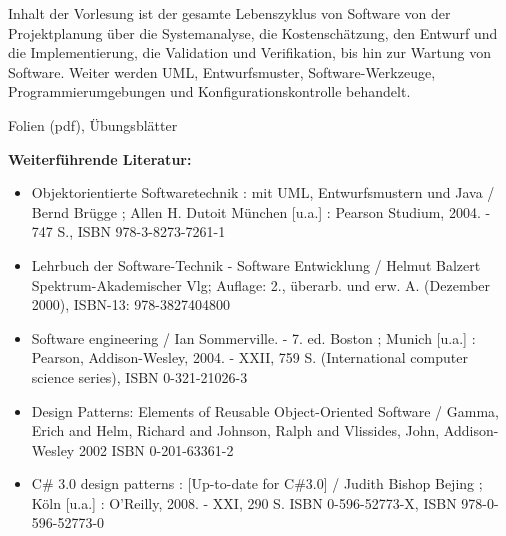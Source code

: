 \begin{course}
\begin{content}
Inhalt der Vorlesung ist der gesamte Lebenszyklus von Software von der Projektplanung über die Systemanalyse, die Kostenschätzung, den Entwurf und die Implementierung, die Validation und Verifikation, bis hin zur Wartung von Software. Weiter werden UML, Entwurfsmuster, Software-Werkzeuge, Programmierumgebungen und Konfigurationskontrolle behandelt.


\end{content}

\begin{media}Folien (pdf), Übungsblätter

\end{media}

\begin{literature}\textbf{Weiterführende Literatur:}

 \begin{itemize}\item Objektorientierte Softwaretechnik : mit UML, Entwurfsmustern und Java / Bernd Brügge ; Allen H. Dutoit\newline
 München [u.a.] : Pearson Studium, 2004. - 747 S., ISBN 978-3-8273-7261-1  \item Lehrbuch der Software-Technik - Software Entwicklung / Helmut Balzert\newline
Spektrum-Akademischer Vlg; Auflage: 2., überarb. und erw. A. (Dezember 2000), ISBN-13: 978-3827404800  \item Software engineering / Ian Sommerville. - 7. ed.\newline
Boston ; Munich [u.a.] : Pearson, Addison-Wesley, 2004. - XXII, 759 S. \newline
(International computer science series), ISBN 0-321-21026-3  \item Design Patterns: Elements of Reusable Object-Oriented Software / Gamma, Erich and Helm, Richard and Johnson, Ralph and Vlissides, John, Addison-Wesley 2002\newline
ISBN 0-201-63361-2  \item C\# 3.0 design patterns : [Up-to-date for C\#3.0] / Judith Bishop\newline
Bejing ; Köln [u.a.] : O'Reilly, 2008. - XXI, 290 S. \newline
ISBN 0-596-52773-X, ISBN 978-0-596-52773-0  \end{itemize}\end{literature}



\end{course}